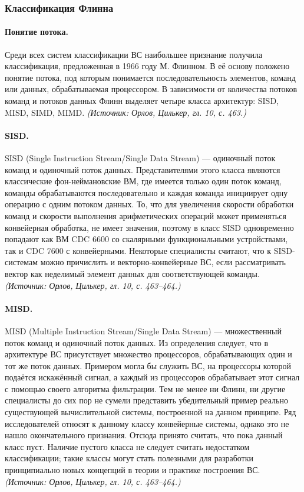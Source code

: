 \documentclass[a4paper,12pt]{article}
\begin{document}
\subsubsection{Классификация Флинна}

\paragraph{Понятие потока.}
Среди всех систем классификации ВС наибольшее признание получила классификация, предложенная в 1966 году М. Флинном. В её основу положено понятие потока, под которым понимается последовательность элементов, команд или данных, обрабатываемая процессором. В зависимости от количества потоков команд и потоков данных Флинн выделяет четыре класса архитектур: SISD, MISD, SIMD, MIMD.
\textit{(Источник: Орлов, Цилькер, гл. 10, с. 463.)}

\paragraph{SISD.}
SISD (Single Instruction Stream/Single Data Stream) — одиночный поток команд и одиночный поток данных. Представителями этого класса являются классические фон-неймановские ВМ, где имеется только один поток команд, команды обрабатываются последовательно и каждая команда инициирует одну операцию с одним потоком данных. То, что для увеличения скорости обработки команд и скорости выполнения арифметических операций может применяться конвейерная обработка, не имеет значения, поэтому в класс SISD одновременно попадают как ВМ CDC 6600 со скалярными функциональными устройствами, так и CDC 7600 с конвейерными. Некоторые специалисты считают, что к SISD-системам можно причислить и векторно-конвейерные ВС, если рассматривать вектор как неделимый элемент данных для соответствующей команды.
\textit{(Источник: Орлов, Цилькер, гл. 10, с. 463--464.)}

\paragraph{MISD.}
MISD (Multiple Instruction Stream/Single Data Stream) — множественный поток команд и одиночный поток данных. Из определения следует, что в архитектуре ВС присутствует множество процессоров, обрабатывающих один и тот же поток данных. Примером могла бы служить ВС, на процессоры которой подаётся искажённый сигнал, а каждый из процессоров обрабатывает этот сигнал с помощью своего алгоритма фильтрации. Тем не менее ни Флинн, ни другие специалисты до сих пор не сумели представить убедительный пример реально существующей вычислительной системы, построенной на данном принципе. Ряд исследователей относят к данному классу конвейерные системы, однако это не нашло окончательного признания. Отсюда принято считать, что пока данный класс пуст. Наличие пустого класса не следует считать недостатком классификации; такие классы могут стать полезными для разработки принципиально новых концепций в теории и практике построения ВС.
\textit{(Источник: Орлов, Цилькер, гл. 10, с. 463--464.)}
\end{document}
